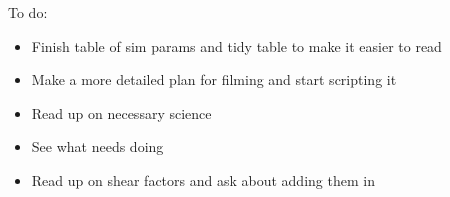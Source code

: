\documentclass{article}
\begin{document}
\noindent To do:
\begin{itemize}
  \item Finish table of sim params and tidy table to make it easier to read
  \item Make a more detailed plan for filming and start scripting it
  \item Read up on necessary science
  \item See what needs doing
  \item Read up on shear factors and ask about adding them in
\end{itemize}
\end{document}
